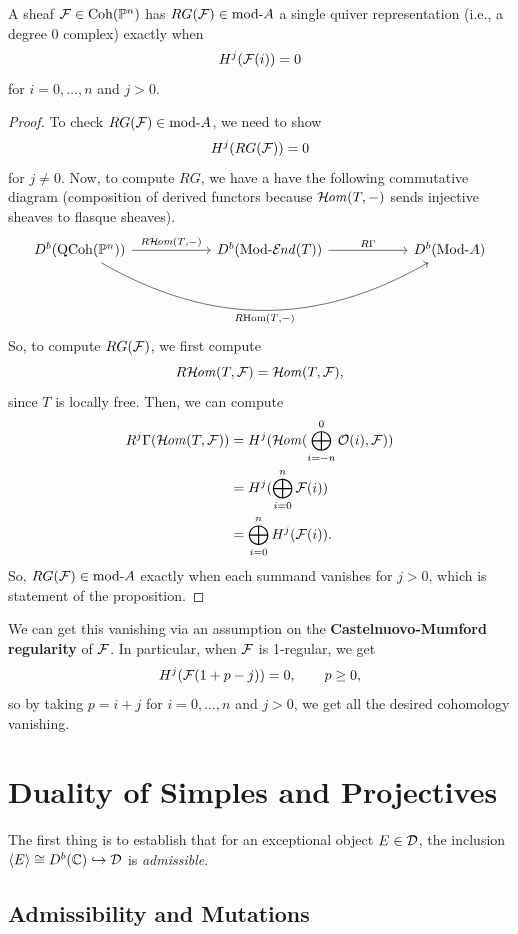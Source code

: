 \documentclass[12pt]{article}
\begin{document}
\begin{prop}
    A sheaf $\mathcal{F} \in \operatorname{Coh}(\mathbb{P}^n)$ has $RG(\mathcal{F})\in \mathrm{mod}\text{-} A$ a single quiver representation (i.e., a degree 0 complex) exactly when
    \[H^j(\mathcal{F}(i)) = 0\]
    for $i=0,\dots,n$ and $j>0$.
\end{prop}

\begin{proof}
    To check $RG(\mathcal{F}) \in \mathrm{mod}\text{-} A$, we need to show
    \[H^j(RG(\mathcal{F})) = 0\]
    for $j\neq 0$. Now, to compute $RG$, we have a have the following commutative diagram (composition of derived functors because $\mathcal{H}\kern -1pt \mathit{om}(T,-)$ sends injective sheaves to flasque sheaves).
    \[\begin{tikzcd}[column sep=2cm]
        D^b(\QCoh(\P^n)) \rar["R\cHom(T{,}-)"] \ar[rr,bend right,"R\Hom(T{,}-)"'] & D^b(\rMod\cEnd(T)) \rar["R\Gamma"] & D^b(\rMod A)
    \end{tikzcd}\]
    So, to compute $RG(\mathcal{F})$, we first compute
    \[R\mathcal{H}\kern -1pt \mathit{om}(T,\mathcal{F}) = \mathcal{H}\kern -1pt \mathit{om}(T,\mathcal{F}),\]
    since $T$ is locally free. Then, we can compute
    \begin{align*}
        R^j \Gamma(\mathcal{H}\kern -1pt \mathit{om}(T,\mathcal{F})) &= H^j(\mathcal{H}\kern -1pt \mathit{om}(\bigoplus_{i=-n}^0 \mathcal{O}(i), \mathcal{F}))\\
        &= H^j(\bigoplus_{i=0}^n \mathcal{F}(i))\\
        &= \bigoplus_{i=0}^n H^j(\mathcal{F}(i)).
    \end{align*}
    So, $RG(\mathcal{F}) \in \mathrm{mod}\text{-} A$ exactly when each summand vanishes for $j>0$, which is statement of the proposition.
\end{proof}

\begin{rmk}
    We can get this vanishing via an assumption on the \textbf{Castelnuovo-Mumford regularity} of $\mathcal{F}$. In particular, when $\mathcal{F}$ is 1-regular, we get
    \[H^j(\mathcal{F}(1+p-j))=0, \qquad p\geq 0,\]
    so by taking $p=i+j$ for $i=0,\dots,n$ and $j>0$, we get all the desired cohomology vanishing.
\end{rmk}


\section{Duality of Simples and Projectives}

The first thing is to establish that for an exceptional object $E\in \mathcal{D}$, the inclusion $\left\langle E\right\rangle \cong D^b(\mathbb{C}) \hookrightarrow \mathcal{D}$ is \textit{admissible}.

\subsection{Admissibility and Mutations}
\end{document}
